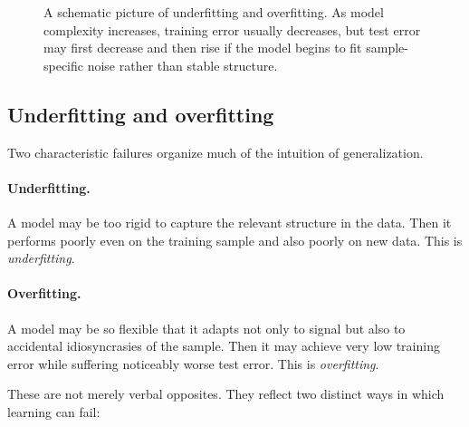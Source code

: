 \begin{figure}[tbp]
\centering
{}
\caption{A schematic picture of underfitting and overfitting. As model complexity increases, training error usually decreases, but test error may first decrease and then rise if the model begins to fit sample-specific noise rather than stable structure.}
\end{figure}

\subsection*{Underfitting and overfitting}

Two characteristic failures organize much of the intuition of generalization.

\paragraph{Underfitting.}
A model may be too rigid to capture the relevant structure in the data. Then it performs poorly even on the training sample and also poorly on new data. This is \emph{underfitting}.

\paragraph{Overfitting.}
A model may be so flexible that it adapts not only to signal but also to accidental idiosyncrasies of the sample. Then it may achieve very low training error while suffering noticeably worse test error. This is \emph{overfitting}.

These are not merely verbal opposites. They reflect two distinct ways in which learning can fail:

